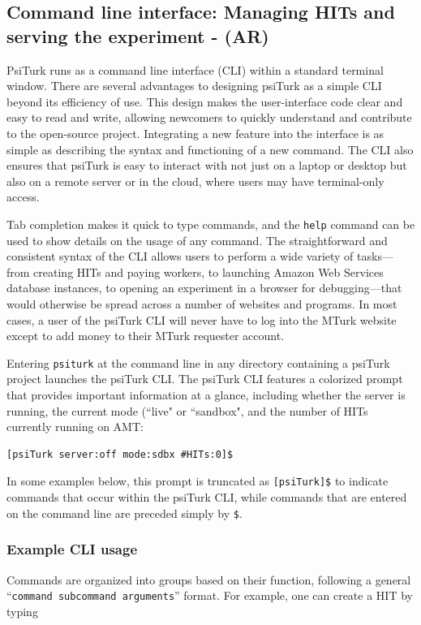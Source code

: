\documentclass[twocolumn]{svjour3}          %
\begin{document}
\subsection{Command line interface: Managing HITs and serving the experiment - (AR)}

PsiTurk runs as a command line interface (CLI) within a standard terminal window.
There are several advantages to designing psiTurk as a simple CLI beyond its efficiency of use. This
design makes the user-interface code clear and easy to read and write, allowing newcomers to quickly
understand and contribute to the open-source project. Integrating a new feature into the interface
is as simple as describing the syntax and functioning of a new command. The CLI also ensures that
psiTurk is easy to interact with not just on a laptop or desktop but also on a remote server or in
the cloud, where users may have terminal-only access.
 
Tab completion makes it quick to type commands, and the \texttt{help} command can be used to show
details on the usage of any command. 
The straightforward and consistent syntax of the CLI allows
users to perform a wide variety of tasks---from creating HITs and paying workers, to launching Amazon
Web Services database instances, to opening an experiment in a browser for debugging---that
would otherwise be spread across a number of websites and programs. In most cases, a user of the
psiTurk CLI will never have to log into the MTurk website except to add money to their MTurk
requester account.


Entering
\texttt{psiturk} at the command line in any directory containing a psiTurk project launches the
psiTurk CLI.
The psiTurk CLI features a colorized prompt that provides important information at a glance, including
whether the server is running, the current mode (``live" or ``sandbox", and the number of HITs currently running on AMT:

\begin{lstlisting}
[psiTurk server:off mode:sdbx #HITs:0]$
\end{lstlisting}

\noindent In some examples below, this prompt is truncated as \texttt{[psiTurk]\$} to indicate commands that occur within the psiTurk CLI, while commands that are entered on the command line are preceded simply by \texttt{\$}.


\subsubsection{Example CLI usage}
Commands are organized into groups based on their function, following a general ``\texttt{command subcommand
arguments}'' format. For example, one can create a HIT by typing 
\end{document}
